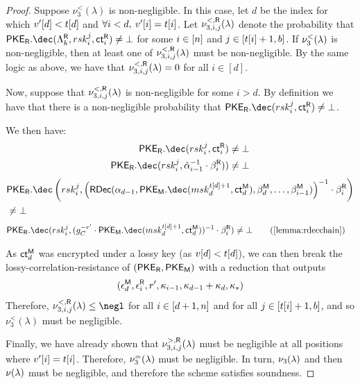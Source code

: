 \begin{proof}
	\newcommand{\badprobrevnonbot}[2]{\ensuremath{\nu_{3, #1, #2}^{<, \mathsf{\rev}}}}
	Suppose $\nu_3^{<}(\lambda)$ is non-negligible.
	In this case, let $d$ be the index for which $v'[d] < t[d]$ and $\forall i < d, \: v'[i] = t[i]$.
	Let $\badprobrevnonbot{i}{j}(\secpar)$ denote the probability that $\pker.\dec(\allowbreak\pkerpp,\allowbreak \revsk_i^j,\allowbreak \revct_i) \allowbreak\neq\allowbreak \bot$ for some $i \in [n]$ and $j \in [t[i] + 1, b]$.
	If $\nu_3^{<}(\lambda)$ is non-negligible, then at least one of $\badprobrevnonbot{i}{j}(\secpar)$ must be non-negligible.
	By the same logic as above, we have that $\badprobrevnonbot{i}{j}(\secpar) = 0$ for all $i \in [d]$.

	Now, suppose that $\badprobrevnonbot{i}{j}(\secpar)$ is non-negligible for some $i > d$.
	By definition we have that there is a non-negligible probability that $\pker.\dec(\revsk_i^j, \revct_i) \neq \bot$.

	We then have:
	\begin{align*}
		\pker.\dec(\revsk_i^j, \revct_i)                                       & \neq \bot \\
		\pker.\dec(\revsk_i^j,\tilde{\otpk}_{i-1}^{-1} \cdot \otpct_i^{\rev})) & \neq \bot \\
	\end{align*}
	\vspace{-6em}
	\begin{align*}
		 & \pker.\dec\left(\revsk_i^j, \left(\rdec(\otpk_{d - 1}, \pkem.\dec(\matsk_d^{\thr[d] + 1}, \matct_d), \otpct_{d}^\mat, \dots, \otpct_{i - 1}^\mat)
		\right)^{-1} \cdot \otpct_i^{\rev} \right)                                                                                                           \\
		 & \neq \bot
	\end{align*}
	\begin{align*}
		\pker.\dec(\revsk_i^j, (g_C^{-r'}\cdot \pkem.\dec(\matsk_d^{\thr[d] + 1}, \matct_d))^{-1}\cdot \otpct_i^{\rev}) & \neq \bot \tag{\cref{lemma:rdecchain}}
	\end{align*}

	As $\mathsf{ct}^{\sf M}_d$ was encrypted under a lossy key (as $v[d] < t[d]$), we can then break the lossy-correlation-resistance of $({{\mathsf{PKE}_{{\mathsf{R}}}}}, {{\mathsf{PKE}_{{\mathsf{M}}}}})$ with a reduction that outputs
	$$
		(\epsilon^{{{\mathsf{M}}}}_d,  \epsilon^{{{\mathsf{R}}}}_i, r', \kappa_{i - 1}, \kappa_{d - 1} + \kappa_d, \kappa_*)
	$$
	Therefore, $\badprobrevnonbot{i}{j}(\secpar) \leq \negl$ for all $i \in [d + 1, n]$
	and for all $j \in [t[i] + 1, b]$, and so $\nu_3^{<}(\lambda)$ must be negligible.

	Finally, we have already shown that $\nu_{3, i, j}^{>, \mathsf{{{\mathsf{R}}}}}(\lambda)$ must be negligible at all positions where $v'[i] = t[i]$.
	Therefore, $\nu_3^{=}(\lambda)$ must be negligible.
	In turn, $\nu_3(\lambda)$ and then $\nu(\lambda)$ must be negligible, and therefore the scheme satisfies soundness.
\end{proof}

